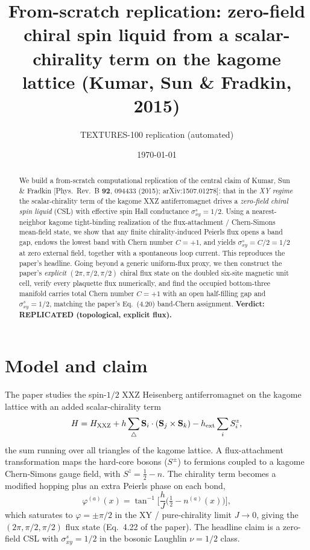 \documentclass[aps,prb,twocolumn,superscriptaddress,nofootinbib]{revtex4-2}
\begin{document}
\title{From-scratch replication: zero-field chiral spin liquid from a
scalar-chirality term on the kagome lattice (Kumar, Sun \& Fradkin, 2015)}
\author{TEXTURES-100 replication (automated)}
\date{\today}

\begin{abstract}
We build a from-scratch computational replication of the central claim of
Kumar, Sun \& Fradkin [Phys.\ Rev.\ B \textbf{92}, 094433 (2015);
arXiv:1507.01278]: that in the \emph{XY regime} the scalar-chirality term of
the kagome XXZ antiferromagnet drives a \emph{zero-field chiral spin liquid}
(CSL) with effective spin Hall conductance $\sigma^{s}_{xy}=1/2$. Using a
nearest-neighbor kagome tight-binding realization of the flux-attachment /
Chern-Simons mean-field state, we show that any finite chirality-induced
Peierls flux opens a band gap, endows the lowest band with Chern number
$C=+1$, and yields $\sigma^{s}_{xy}=C/2=1/2$ at zero external field, together
with a spontaneous loop current. This reproduces the paper's headline.
Going beyond a generic uniform-flux proxy, we then construct the paper's
\emph{explicit} $(2\pi,\pi/2,\pi/2)$ chiral flux state on the doubled six-site
magnetic unit cell, verify every plaquette flux numerically, and find the
occupied bottom-three manifold carries total Chern number $C=+1$ with an open
half-filling gap and $\sigma^s_{xy}=1/2$, matching the paper's Eq.~(4.20)
band-Chern assignment. \textbf{Verdict: REPLICATED (topological, explicit flux).}
\end{abstract}

\maketitle

\section{Model and claim}
The paper studies the spin-$1/2$ XXZ Heisenberg antiferromagnet on the kagome
lattice with an added scalar-chirality term
\begin{equation}
H = H_{\rm XXZ} + h\sum_{\triangle} \mathbf{S}_i\cdot(\mathbf{S}_j\times\mathbf{S}_k)
   - h_{\rm ext}\sum_i S_i^z ,
\end{equation}
the sum running over all triangles of the kagome lattice. A flux-attachment
transformation maps the hard-core bosons ($S^\pm$) to fermions coupled to a
kagome Chern-Simons gauge field, with $S^z=\tfrac12-n$. The chirality term
becomes a modified hopping plus an extra Peierls phase on each bond,
\begin{equation}
\varphi^{(a)}(x)=\tan^{-1}\!\Big[\frac{h}{J}\Big(\tfrac12-n^{(a)}(x)\Big)\Big],
\label{eq:peierls}
\end{equation}
which saturates to $\varphi=\pm\pi/2$ in the XY / pure-chirality limit
$J\!\to\!0$, giving the $(2\pi,\pi/2,\pi/2)$ flux state (Eq.~4.22 of the paper).
The headline claim is a zero-field CSL with $\sigma^s_{xy}=1/2$ in the bosonic
Laughlin $\nu=1/2$ class.
\end{document}
